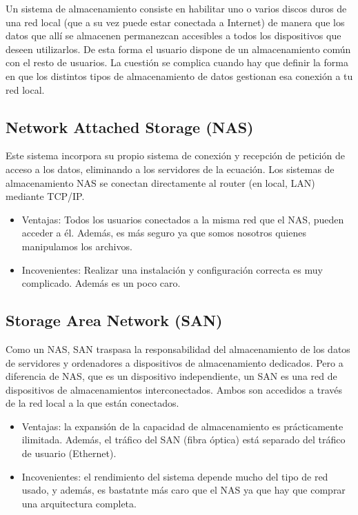 Un sistema de almacenamiento consiste en habilitar uno o varios discos duros de una red local (que a su vez puede estar conectada a Internet) de manera que los datos que allí se almacenen permanezcan accesibles a todos los dispositivos que deseen utilizarlos. De esta forma el usuario dispone de un almacenamiento común con el resto de usuarios.
La cuestión se complica cuando hay que definir la forma en que los distintos tipos de almacenamiento de datos gestionan esa conexión a tu red local.

\subsection{Network Attached Storage (NAS)}

Este sistema incorpora su propio sistema de conexión y recepción de petición de acceso a los datos, eliminando a los servidores de la ecuación. Los sistemas de almacenamiento NAS se conectan directamente al router (en local, LAN) mediante TCP/IP.

\begin{itemize}
\item Ventajas: Todos los usuarios conectados a la misma red que el NAS, pueden acceder a él. Además, es más seguro ya que somos nosotros quienes manipulamos los archivos.
\item Incovenientes: Realizar una instalación y configuración correcta es muy complicado. Además es un poco caro.
\end{itemize}
\subsection{Storage Area Network (SAN)}


Como un NAS, SAN traspasa la responsabilidad del almacenamiento de los datos de servidores y ordenadores a dispositivos de almacenamiento dedicados. Pero a diferencia de NAS, que es un dispositivo independiente, un SAN es una red de dispositivos de almacenamientos interconectados. Ambos son accedidos a través de la red local a la que están conectados.

\begin{itemize}
\item Ventajas: la expansión de la capacidad de almacenamiento es prácticamente ilimitada. Además, el tráfico del SAN (fibra óptica) está separado del tráfico de usuario (Ethernet).
\item Incovenientes: el rendimiento del sistema depende mucho del tipo de red usado, y además, es bastatnte más caro que el NAS ya que hay que comprar una arquitectura completa.
\end{itemize}

